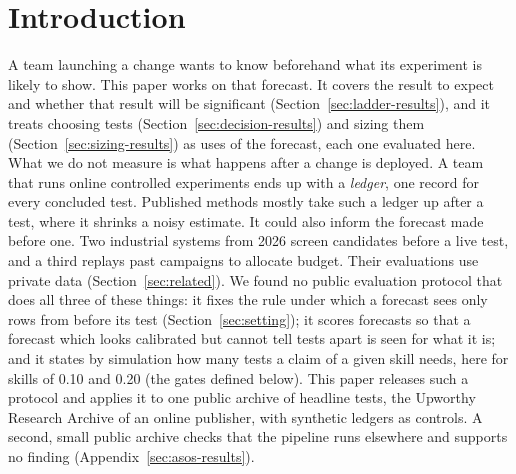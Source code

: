 \documentclass[sigconf,nonacm]{acmart}
\begin{document}
\maketitle

\section{Introduction}
\label{sec:intro}
A team launching a change wants to know beforehand what its experiment is likely to show. This paper works on that forecast. It covers the result to expect and whether that result will be significant (Section~\ref{sec:ladder-results}), and it treats choosing tests (Section~\ref{sec:decision-results}) and sizing them (Section~\ref{sec:sizing-results}) as uses of the forecast, each one evaluated here. What we do not measure is what happens after a change is deployed. A team that runs online controlled experiments ends up with a \emph{ledger}, one record for every concluded test. Published methods mostly take such a ledger up after a test, where it shrinks a noisy estimate. It could also inform the forecast made before one. Two industrial systems from 2026 screen candidates before a live test, and a third replays past campaigns to allocate budget. Their evaluations use private data (Section~\ref{sec:related}). We found no public evaluation protocol that does all three of these things: it fixes the rule under which a forecast sees only rows from before its test (Section~\ref{sec:setting}); it scores forecasts so that a forecast which looks calibrated but cannot tell tests apart is seen for what it is; and it states by simulation how many tests a claim of a given skill needs, here for skills of 0.10 and 0.20 (the gates defined below). This paper releases such a protocol and applies it to one public archive of headline tests, the Upworthy Research Archive of an online publisher, with synthetic ledgers as controls. A second, small public archive checks that the pipeline runs elsewhere and supports no finding (Appendix~\ref{sec:asos-results}).
\end{document}

